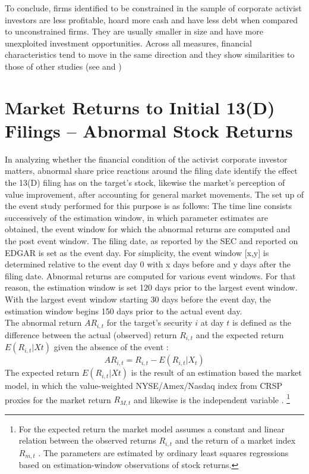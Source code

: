 \documentclass[12pt]{article}
\begin{document}
To conclude, firms identified to be constrained in the sample of corporate activist investors are less profitable, hoard more cash and have less debt when compared to unconstrained firms. They are usually smaller in size and have more unexploited investment opportunities. Across all measures, financial characteristics tend to move in the same direction and they show similarities to those of other studies (see \citet[p.544]{Whited2006} and \citet[p.1917]{hadlock2010})

\section{Market Returns to Initial 13(D) Filings -- Abnormal Stock Returns}
In analyzing whether the financial condition of the activist corporate investor matters, abnormal share price reactions around the filing date identify the effect the 13(D) filing has on the target's stock, likewise the market's perception of value improvement, after accounting for general market movements.
The set up of the event study performed for this purpose is as follows: The time line consists successively of the estimation window, in which parameter estimates are obtained, the event window for which the abnormal returns are computed and the post event window. 
The filing date, as reported by the SEC and reported on EDGAR is set as the event day. For simplicity, the event window [x,y] is determined relative to the event day 0 with x days before and y days after the filing date. Abnormal returns are computed for various event windows. For that reason, the estimation window is set 120 days prior to the largest event window. With the largest event window starting 30 days before the event day, the estimation window begins 150 days prior to the actual event day.\\
The abnormal return $AR_{i,t}$ for the target's security $i$ at day $t$ is defined as the difference between the actual (observed) return $R_{i,t}$ and the expected return $E(R_{i,t}|X{t})$ given the absence of the event \citep[p.15]{MacKinlay1997}:
	\begin{equation}\label{eq:1}
		AR_{i,t}=R_{i,t}-E(R_{i,t}|X_{t})
	\end{equation}
The expected return $E(R_{i,t}|X{t})$ is the result of an estimation based the market model, in which the value-weighted NYSE/Amex/Nasdaq index from CRSP proxies for the market return $R_{M,t}$ and likewise is the independent variable \citep[p.18]{MacKinlay1997}.
	\footnote{For the expected return the market model assumes a constant and linear relation between the observed returns $R_{i,t}$ and the return of a market index $R_{m,t}$ \citep[p.18]{MacKinlay1997}. The parameters are estimated by ordinary least squares regressions based on estimation-window observations of stock returns.}
\end{document}
